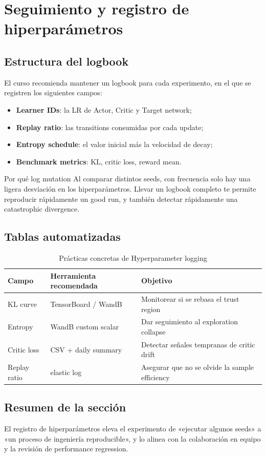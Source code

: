 \section{Seguimiento y registro de hiperparámetros}

\subsection{Estructura del logbook}

El curso recomienda mantener un logbook para cada experimento, en el que se registren los siguientes campos:

\begin{itemize}
    \item \textbf{Learner IDs}: la LR de Actor, Critic y Target network;
    \item \textbf{Replay ratio}: las transitions consumidas por cada update;
    \item \textbf{Entropy schedule}: el valor inicial más la velocidad de decay;
    \item \textbf{Benchmark metrics}: KL, critic loss, reward mean.
\end{itemize}

\begin{importantbox}{Por qué log mutation}
Al comparar distintos seeds, con frecuencia solo hay una ligera desviación en los hiperparámetros. Llevar un logbook completo te permite reproducir rápidamente un good run, y también detectar rápidamente una catastrophic divergence.
\end{importantbox}

\subsection{Tablas automatizadas}

\begin{table}[H]
\centering
\begin{tabular}{p{}p{}p{}}
\toprule
Campo & Herramienta recomendada & Objetivo \\
\midrule
KL curve & TensorBoard / WandB & Monitorear si se rebasa el trust region \\
Entropy & WandB custom scalar & Dar seguimiento al exploration collapse \\
Critic loss & CSV + daily summary & Detectar señales tempranas de critic drift \\
Replay ratio & elastic log & Asegurar que no se olvide la sample efficiency \\
\bottomrule
\end{tabular}
\caption{Prácticas concretas de Hyperparameter logging}
\end{table}

\subsection{Resumen de la sección}

El registro de hiperparámetros eleva el experimento de «ejecutar algunos seeds» a «un proceso de ingeniería reproducible», y lo alinea con la colaboración en equipo y la revisión de performance regression.

